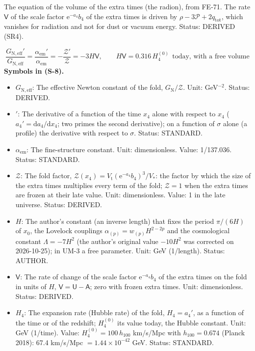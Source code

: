 \documentclass[
  10pt,
]{article}
\providecommand{\tightlist}{%
  \setlength{\itemsep}{0pt}\setlength{\parskip}{0pt}}
\begin{document}
The equation of the volume of the extra times (the radion), from FE-71.
The rate \(\mathsf{V}\) of the scale factor \(\mathrm{e}^{-a_4}b_4\) of
the extra times is driven by
\(\rho - 3\mathcal{P} + 2q_{\mathrm{tot}}\), which vanishes for
radiation and not for dust or vacuum energy. Status: DERIVED (SR4).

\[
\frac{G_{\mathrm{N,eff}}'}{G_{\mathrm{N,eff}}} = \frac{\alpha_{\mathrm{em}}'}{\alpha_{\mathrm{em}}} = -\frac{\mathcal{Z}'}{\mathcal{Z}} = -3H\mathsf{V},\qquad
H\mathsf{V} = 0.316\,H_4^{(0)}\ \ \text{today, with a free volume} \tag{S-8}
\] \textbf{Symbols in (S-8).}

\begin{itemize}
\tightlist
\item
  \(G_{\mathrm{N,eff}}\): The effective Newton constant of the fold,
  \(G_{\mathrm{N}}/\mathcal{Z}\). Unit: GeV\(^{-2}\). Status: DERIVED.
\item
  \({}'\): The derivative of a function of the time \(x_4\) alone with
  respect to \(x_4\) (\(a_4' = \mathrm{d}a_4/\mathrm{d}x_4\); two primes
  the second derivative); on a function of \(\sigma\) alone (a profile)
  the derivative with respect to \(\sigma\). Status: STANDARD.
\item
  \(\alpha_{\mathrm{em}}\): The fine-structure constant. Unit:
  dimensionless. Value: 1/137.036. Status: STANDARD.
\item
  \(\mathcal{Z}\): The fold factor,
  \(\mathcal{Z}(x_4) = V_{\mathrm{t}}(\mathrm{e}^{-a_4}b_4)^3/V_*\): the
  factor by which the size of the extra times multiplies every term of
  the fold; \(\mathcal{Z} = 1\) when the extra times are frozen at their
  late value. Unit: dimensionless. Value: 1 in the late universe.
  Status: DERIVED.
\item
  \(H\): The author's constant (an inverse length) that fixes the period
  \(\pi/(6H)\) of \(x_0\), the Lovelock couplings
  \(\alpha_{(p)} = w_{(p)}H^{2-2p}\) and the cosmological constant
  \(\Lambda = -7H^2\) (the author's original value \(-10H^2\) was
  corrected on 2026-10-25); in UM-3 a free parameter. Unit: GeV
  (1/length). Status: AUTHOR.
\item
  \(\mathsf{V}\): The rate of change of the scale factor
  \(\mathrm{e}^{-a_4}b_4\) of the extra times on the fold in units of
  \(H\), \(\mathsf{V} = \mathsf{U} - \mathsf{A}\); zero with frozen
  extra times. Unit: dimensionless. Status: DERIVED.
\item
  \(H_4\): The expansion rate (Hubble rate) of the fold, \(H_4 = a_4'\),
  as a function of the time or of the redshift; \(H_4^{(0)}\) its value
  today, the Hubble constant. Unit: GeV (1/time). Value:
  \(H_4^{(0)} = 100\,h_{100}\) km/s/Mpc with \(h_{100} = 0.674\) (Planck
  2018): 67.4 km/s/Mpc \(= 1.44\times10^{-42}\) GeV. Status: STANDARD.
\end{itemize}
\end{document}
